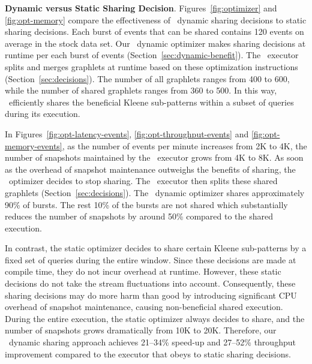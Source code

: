 \textbf{Dynamic versus Static Sharing Decision}.
%
Figures~\ref{fig:optimizer} and \ref{fig:opt-memory} compare the effectiveness of \app\ dynamic sharing decisions to static sharing decisions. 
Each burst of events that can be shared contains 120 events on average in the stock data set. Our \app\ dynamic optimizer makes sharing decisions at runtime per each burst of events (Section~\ref{sec:dynamic-benefit}). The \app\ executor splits and merges graphlets at runtime based on these optimization instructions (Section~\ref{sec:decisions}). The number of all graphlets ranges from 400 to 600, while the number of shared graphlets ranges from 360 to 500. In this way, \app\ efficiently shares the beneficial Kleene sub-patterns within a subset of queries during its execution.



In Figures~\ref{fig:opt-latency-events}, \ref{fig:opt-throughput-events} and \ref{fig:opt-memory-events}, as the number of events per minute increases from 2K to 4K, the number of snapshots maintained by the \app\ executor grows from 4K to 8K. As soon as the overhead of snapshot maintenance outweighs the benefits of sharing, the \app\ optimizer decides to stop sharing. The \app\ executor then splits these shared graphlets (Section~\ref{sec:decisions}). The \app\ dynamic optimizer shares approximately 90\% of bursts. The rest 10\% of the bursts are not shared which substantially reduces the number of snapshots by around 50\% compared to the shared execution. 

In contrast, the static optimizer decides to share certain Kleene sub-patterns by a fixed set of queries during the entire window. Since these decisions are made at compile time, they do not incur overhead at runtime. However, these static decisions do not take the stream fluctuations into account. Consequently, these sharing decisions may do more harm than good by introducing significant CPU overhead of snapshot maintenance, causing non-beneficial shared execution. During the entire execution, the static optimizer always decides to share, and the number of snapshots grows dramatically from 10K to 20K. 
Therefore, our \app\ dynamic sharing approach achieves 
21--34\% speed-up and
27--52\% throughput improvement
compared to the executor that obeys to static sharing decisions.

